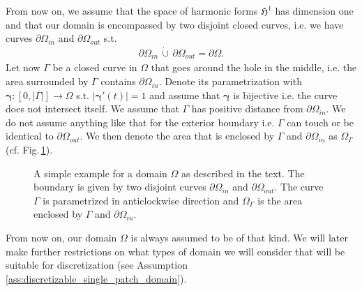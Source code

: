\documentclass[../master_thesis.tex]{subfiles}
\begin{document}
From now on, we assume that the space of harmonic forms $\mathfrak{H}^1$ has dimension 
one and that our domain is encompassed by two disjoint closed curves,
i.e. we have curves $\partial \Omega_{in}$ and $\partial \Omega_{out}$ s.t. 
\begin{align*}
    \partial \Omega_{in} \,\dot\cup \,\partial\Omega_{out} = \partial\Omega. 
\end{align*}
Let now $\Gamma$ be a closed curve in $\Omega$ that goes around the 
hole in the middle, i.e. the area surrounded by $\Gamma$ contains $\partial \Omega_{in}$.
Denote its parametrization with $\bm{\gamma}:[0,|\Gamma|] \rightarrow \Omega$ s.t. 
$|\bm{\gamma}'(t)| = 1$ and assume that $\bm{\gamma}$ is bijective i.e. the curve does not 
intersect itself. We assume that $\Gamma$ has positive distance from 
$\partial \Omega_{in}$. We do not assume anything like that for the exterior boundary 
i.e. $\Gamma$ can touch or be identical to $\partial \Omega_{out}$. 
We then denote the area that is enclosed by $\Gamma$ and
$\partial\Omega_{in}$ as $\Omega_\Gamma$ (cf. Fig.\,\ref{fig:annulus_domain}). 

\begin{figure}
    \centering
\caption{A simple example for a domain $\Omega$ as described in the text. The boundary 
is given by two 
disjoint curves $\partial \Omega_{in}$ and $\partial \Omega_{out}$. The curve 
$\Gamma$ is parametrized in anticlockwise direction and $\Omega_\Gamma$ is the 
area enclosed by $\Gamma$ and $\partial \Omega_{in}$.} \label{fig:annulus_domain}
\end{figure}

From now on, our domain $\Omega$ is always assumed to be of that kind. We will 
later make further restrictions on what types of domain we will consider that 
will be suitable for discretization (see Assumption\,\ref{ass:discretizable_single_patch_domain}).
\end{document}
